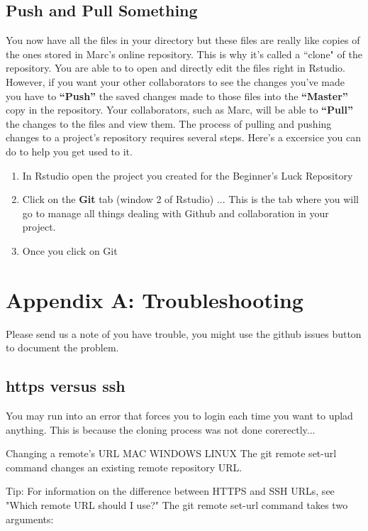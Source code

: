 \documentclass{article}\usepackage[]{graphicx}\usepackage[]{color}
\begin{document}
  \subsection*{Push and Pull Something}
  You now have all the files in your directory but these files are really like copies of the ones stored in Marc's online repository. This is why it's called a ``clone" of the repository. You are able to to open and directly edit the files right in Rstudio. However, if you want your other collaborators to see the changes you've made you have to \textbf{``Push''} the saved changes made to those files into the \textbf{``Master''} copy in the repository. Your collaborators, such as Marc, will be able to \textbf{``Pull''} the changes to the files and view them. The process of pulling and pushing changes to a project's repository requires several steps. Here's a excersice you can do to help you get used to it. 
  \begin{enumerate}
  \item In Rstudio open the project you created for the Beginner's Luck Repository 
  \item Click on the \textbf{Git} tab (window 2 of Rstudio) ... This is the tab where you will go to manage all things dealing with Github and collaboration in your project.
  \item Once you click on Git
  \end{enumerate}
  
  
\section{Appendix A: Troubleshooting}

Please send us a note of you have trouble, you might use the github issues button to document the problem.

\subsection{https versus ssh}

You may run into an error that forces you to login each time you want to uplad anything. This is because the cloning process was not done corerectly...

Changing a remote's URL
MAC WINDOWS LINUX
The git remote set-url command changes an existing remote repository URL.

Tip: For information on the difference between HTTPS and SSH URLs, see "Which remote URL should I use?"
The git remote set-url command takes two arguments:
\end{document}
